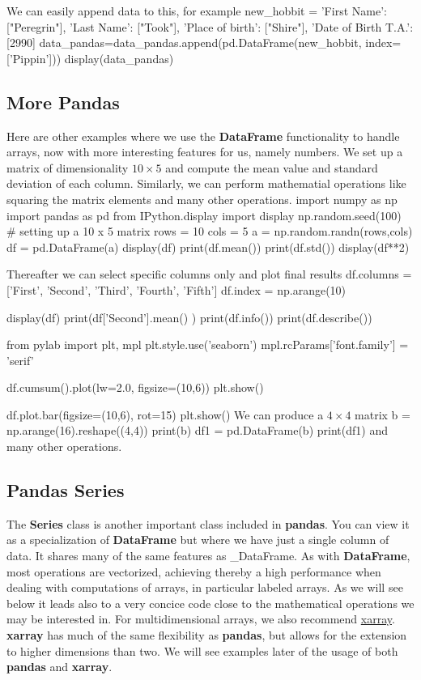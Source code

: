 \documentclass[%
oneside,                 %
final,                   %
10pt]{article}
\begin{document}
We can easily append data to this, for example
\bpycod
new_hobbit = {'First Name': ["Peregrin"],
              'Last Name': ["Took"],
              'Place of birth': ["Shire"],
              'Date of Birth T.A.': [2990]
              }
data_pandas=data_pandas.append(pd.DataFrame(new_hobbit, index=['Pippin']))
display(data_pandas)
\epycod

\subsection{More  Pandas}

Here are other examples where we use the \textbf{DataFrame} functionality to handle arrays, now with more interesting features for us, namely numbers. We set up a matrix 
of dimensionality $10\times 5$ and compute the mean value and standard deviation of each column. Similarly, we can perform mathematial operations like squaring the matrix elements and many other operations. 
\bpycod
import numpy as np
import pandas as pd
from IPython.display import display
np.random.seed(100)
# setting up a 10 x 5 matrix
rows = 10
cols = 5
a = np.random.randn(rows,cols)
df = pd.DataFrame(a)
display(df)
print(df.mean())
print(df.std())
display(df**2)
\epycod

Thereafter we can select specific columns only and plot final results
\bpycod
df.columns = ['First', 'Second', 'Third', 'Fourth', 'Fifth']
df.index = np.arange(10)

display(df)
print(df['Second'].mean() )
print(df.info())
print(df.describe())

from pylab import plt, mpl
plt.style.use('seaborn')
mpl.rcParams['font.family'] = 'serif'

df.cumsum().plot(lw=2.0, figsize=(10,6))
plt.show()


df.plot.bar(figsize=(10,6), rot=15)
plt.show()
\epycod
We can produce a $4\times 4$ matrix
\bpycod
b = np.arange(16).reshape((4,4))
print(b)
df1 = pd.DataFrame(b)
print(df1)
\epycod
and many other operations. 


\subsection{Pandas Series}


The \textbf{Series} class is another important class included in
\textbf{pandas}. You can view it as a specialization of \textbf{DataFrame} but where
we have just a single column of data. It shares many of the same features as _DataFrame. As with \textbf{DataFrame},
most operations are vectorized, achieving thereby a high performance when dealing with computations of arrays, in particular labeled arrays.
As we will see below it leads also to a very concice code close to the mathematical operations we may be interested in.
For multidimensional arrays, we also recommend \href{{http://xarray.pydata.org/en/stable/}}{xarray}. \textbf{xarray} has much of the same flexibility as \textbf{pandas}, but allows for the extension to higher dimensions than two. We will see examples later of the usage of both \textbf{pandas} and \textbf{xarray}. 
\end{document}

